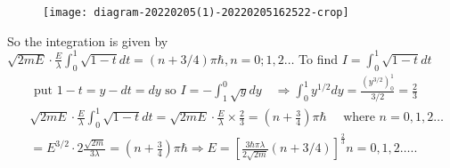\begin{enumerate}
\begin{answer}
\begin{minipage}{0.5\textwidth}
\begin{figure}[H]
	\centering
	\texttt{[image: diagram-20220205(1)-20220205162522-crop]}
\end{figure}
\end{minipage}
So the integration is given by $\sqrt{2 m E} \cdot \frac{E}{\lambda} \int_{0}^{1} \sqrt{1-t} d t=(n+3 / 4) \pi \hbar, n=0 ; 1,2 \ldots$ To find $I=\int_{0}^{1} \sqrt{1-t} d t$\\
\begin{align*}
	&\text { put } 1-t=y-d t=d y \text { so } I=-\int_{1}^{0} \sqrt{y} d y \quad \Rightarrow \int_{0}^{1} y^{1 / 2} d y=\frac{\left(y^{3 / 2}\right)_{0}^{1}}{3 / 2}=\frac{2}{3} \\
	&\sqrt{2 m E} \cdot \frac{E}{\lambda} \int_{0}^{1} \sqrt{1-t} d t=\sqrt{2 m E} \cdot \frac{E}{\lambda} \times \frac{2}{3}=\left(n+\frac{3}{4}\right) \pi \hbar \quad \text { where } n=0,1,2 \ldots \\
	&=E^{3 / 2} \cdot 2 \frac{\sqrt{2 m}}{3 \lambda}=\left(n+\frac{3}{4}\right) \pi \hbar \Rightarrow E=\left[\frac{3 \hbar \pi \lambda}{2 \sqrt{2 m}}(n+3 / 4)\right]^{\frac{2}{3}} n=0,1,2 \ldots . .
\end{align*}	
\end{answer}
 \end{enumerate}
 
 
 
 
 
 
 
 
 
 
 
 
 
 
 
 
 
 
 
 
 
 
 
 
 
 
 
 
 
 
 
 
 
 
 
 
 
 
 
 
 
 
 
 
 
 
 
 
 
 
 
 
 
 
 
 
 
 
 
 
 
 
